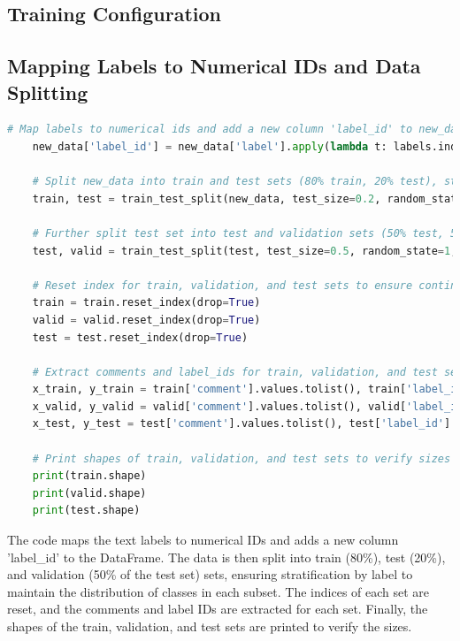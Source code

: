 \documentclass{solutionclass} %
\begin{document}
\subsection*{Training Configuration}



\begin{solution}

    \subsection*{Mapping Labels to Numerical IDs and Data Splitting}

    \begin{lstlisting}[language=Python, basicstyle=\ttfamily\footnotesize, keywordstyle=\color{blue}, commentstyle=\color{gray}]
    # Map labels to numerical ids and add a new column 'label_id' to new_data
    new_data['label_id'] = new_data['label'].apply(lambda t: labels.index(t))
    
    # Split new_data into train and test sets (80% train, 20% test), stratified by 'label'
    train, test = train_test_split(new_data, test_size=0.2, random_state=1, stratify=new_data['label'])
    
    # Further split test set into test and validation sets (50% test, 50% validation), stratified by 'label'
    test, valid = train_test_split(test, test_size=0.5, random_state=1, stratify=test['label'])
    
    # Reset index for train, validation, and test sets to ensure continuous integer indices
    train = train.reset_index(drop=True)
    valid = valid.reset_index(drop=True)
    test = test.reset_index(drop=True)
    
    # Extract comments and label_ids for train, validation, and test sets
    x_train, y_train = train['comment'].values.tolist(), train['label_id'].values.tolist()
    x_valid, y_valid = valid['comment'].values.tolist(), valid['label_id'].values.tolist()
    x_test, y_test = test['comment'].values.tolist(), test['label_id'].values.tolist()
    
    # Print shapes of train, validation, and test sets to verify sizes
    print(train.shape)
    print(valid.shape)
    print(test.shape)
    \end{lstlisting}
    
    The code maps the text labels to numerical IDs and adds a new column 'label\_id' to the DataFrame. The data is then split into train (80\%), test (20\%), and validation (50\% of the test set) sets, ensuring stratification by label to maintain the distribution of classes in each subset. The indices of each set are reset, and the comments and label IDs are extracted for each set. Finally, the shapes of the train, validation, and test sets are printed to verify the sizes.
    

\end{solution}
\end{document}
